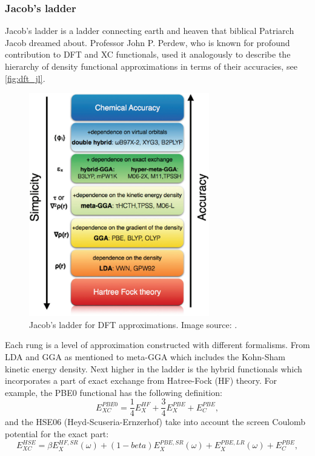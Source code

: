 \subsubsection{Jacob's ladder}
Jacob's ladder is a ladder connecting earth and heaven that biblical Patriarch Jacob dreamed about. Professor John P. Perdew, who is known for profound contribution to DFT and XC functionals, used it analogously to describe the hierarchy of density functional approximations in terms of their accuracies, see \autoref{fig:dft_jl}.  
\begin{figure}[htbp!] 
\centering  
\includegraphics[width=0.7\textwidth]{jacobs.png}
\caption{ Jacob's ladder for DFT approximations. Image source: \cite{Peng2016}.}  
\label{fig:dft_jl}
\end{figure} 
Each rung is a level of approximation constructed with different formalisms. From LDA and GGA as mentioned to meta-GGA which includes the Kohn-Sham kinetic energy density. Next higher in the ladder is the hybrid functionals which incorporates a part of exact exchange from Hatree-Fock (HF) theory. For example, the PBE0 functional\cite{Carlo1999} has the following definition:
\begin{equation}
E_{XC}^{PBE0}=\frac{1}{4}E_X^{HF}+\frac{3}{4}E_X^{PBE}+E_C^{PBE},
\end{equation}
and the HSE06 (Heyd-Scuseria-Ernzerhof)\cite{Jochen2003} take into account the screen Coulomb potential for the exact part:
\begin{equation}
E_{XC}^{HSE}=\beta E_X^{HF,SR}(\omega)+(1-beta)E_X^{PBE,SR}(\omega)+E_X^{PBE,LR}(\omega)+E_C^{PBE},
\end{equation}
